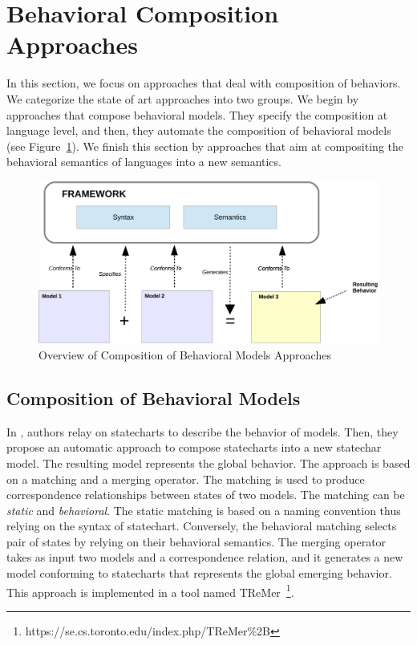 \section{Behavioral Composition Approaches}

In this section, we focus on approaches that deal with composition of behaviors. We categorize the state of art approaches into two groups. We begin by approaches that compose behavioral models. They specify the composition at language level, and then, they automate the composition of behavioral models (see Figure~\ref{fig:behacompomodel}). We finish this section by approaches that aim at compositing the behavioral semantics of languages into a new semantics.  

\begin{figure}
	\begin{center}
		\includegraphics[width=.7\columnwidth]{background/figs/behacompomodel}
		\caption{Overview of Composition of Behavioral Models Approaches}
		\label{fig:behacompomodel}
	\end{center}
\end{figure}
	
\subsection{Composition of Behavioral Models}

In \cite{compostatechartsbib}, authors relay on statecharts to describe the behavior of models. Then, they propose an automatic approach to compose statecharts into a new statechar model. The resulting model represents the global behavior. The approach is based on a matching and a merging operator. The matching is used to produce correspondence relationships between states of two models. The matching can be \emph{static} and \emph{behavioral}. The static matching is based on a naming convention thus relying on the syntax of statechart. Conversely, the behavioral matching selects pair of states by relying on their behavioral semantics. The merging operator takes as input two models and a correspondence relation, and it generates a new model conforming to statecharts that represents the global emerging behavior. This approach is implemented in a tool named TReMer~\footnote{https://se.cs.toronto.edu/index.php/TReMer\%2B}. %
		 
